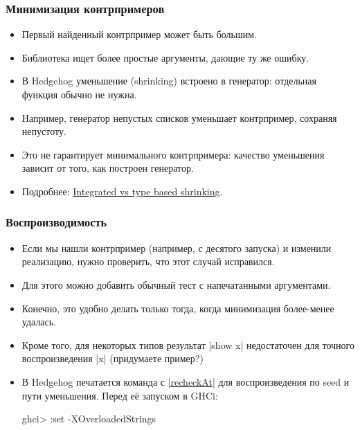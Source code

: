 \documentclass[11pt]{beamer}
\begin{document}
\begin{frame}[fragile]
  \frametitle{Минимизация контрпримеров}
  \begin{itemize}
    \item Первый найденный контрпример может быть большим.
    \item Библиотека ищет более простые аргументы, дающие ту же ошибку.
    \item В Hedgehog уменьшение (shrinking) встроено в генератор: отдельная функция обычно не нужна.
    \item Например, генератор непустых списков уменьшает контрпример, сохраняя непустоту.
    \item Это не гарантирует минимального контрпримера: качество уменьшения зависит от того, как построен генератор.
    \item Подробнее: \href{https://hypothesis.works/articles/integrated-shrinking/}{Integrated vs type based shrinking}.
  \end{itemize}
\end{frame}

\begin{frame}[fragile]
  \frametitle{Воспроизводимость}
  \begin{itemize}
    \item Если мы нашли контрпример (например, с десятого запуска) и изменили реализацию, нужно проверить, что этот случай исправился.
    \item Для этого можно добавить обычный тест с напечатанными аргументами.
    \item Конечно, это удобно делать только тогда, когда минимизация более-менее удалась.
    \item Кроме того, для некоторых типов результат \haskinline|show x| недостаточен для точного воспроизведения \haskinline|x| (придумаете пример?)
    \item В Hedgehog печатается команда с \href{https://hackage.haskell.org/package/hedgehog/docs/Hedgehog.html#v:recheckAt}{\haskinline|recheckAt|} для воспроизведения по seed и пути уменьшения.
          Перед её запуском в GHCi:
          \begin{haskellsmall}
            ghci> :set -XOverloadedStrings
          \end{haskellsmall}
  \end{itemize}
\end{frame}
\end{document}

